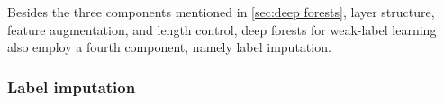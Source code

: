 \documentclass[conference,compsoc]{IEEEtran}
\begin{document}
%
%
%
%

Besides the three components mentioned in \autoref{sec:deep forests}, layer structure, feature augmentation, and length control, deep forests for weak-label learning also employ a fourth component, namely label imputation. 

\subsubsection{Label imputation}
\label{sec:imputation}
\end{document}
